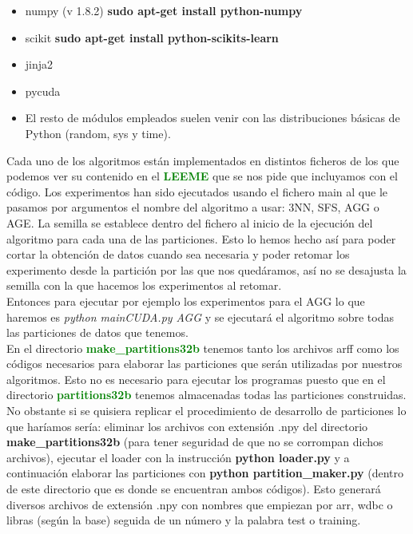 \documentclass[10pt,a4paper]{article}
\begin{document}
\begin{itemize}
\item numpy (v 1.8.2) \textbf{sudo apt-get install python-numpy}
\item scikit \textbf{sudo apt-get install python-scikits-learn}
\item jinja2
\item pycuda
\item El resto de módulos empleados suelen venir con las distribuciones básicas de Python (random, sys y time).
\end{itemize}

Cada uno de los algoritmos están implementados en distintos ficheros de los que podemos ver su contenido en el \textbf{\textcolor{green}{LEEME}} que se nos pide que incluyamos con el código. Los experimentos han sido ejecutados usando el fichero main al que le pasamos por argumentos el nombre del algoritmo a usar: 3NN, SFS, AGG o AGE. La semilla se establece dentro del fichero al inicio de la ejecución del algoritmo para cada una de las particiones. Esto lo hemos hecho así para poder cortar la obtención de datos cuando sea necesaria y poder retomar los experimento desde la partición por las que nos quedáramos, así no se desajusta la semilla con la que hacemos los experimentos al retomar.\\

Entonces para ejecutar por ejemplo los experimentos para el AGG lo que haremos es \textit{python mainCUDA.py AGG} y se ejecutará el algoritmo sobre todas las particiones de datos que tenemos.\\

En el directorio \textbf{\textcolor{green}{make\_partitions32b}} tenemos tanto los archivos arff como los códigos necesarios para elaborar las particiones que serán utilizadas por nuestros algoritmos. Esto no es necesario para ejecutar los programas puesto que en el directorio \textbf{\textcolor{green}{partitions32b}} tenemos almacenadas todas las particiones construidas. No obstante si se quisiera replicar el procedimiento de desarrollo de particiones lo que haríamos sería: eliminar los archivos con extensión .npy del directorio \textbf{make\_partitions32b} (para tener seguridad de que no se corrompan dichos archivos), ejecutar el loader con la instrucción \textbf{python loader.py} y a continuación elaborar las particiones con \textbf{python partition\_maker.py} (dentro de este directorio que es donde se encuentran ambos códigos). Esto generará diversos archivos de extensión .npy con nombres que empiezan por arr, wdbc o libras (según la base) seguida de un número y la palabra test o training.\\
\end{document}
